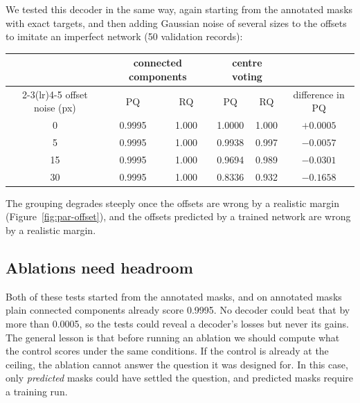 We tested this decoder in the same way, again starting from the annotated masks with exact targets,
and then adding Gaussian noise of several sizes to the offsets to imitate an imperfect
network (50 validation records):
\begin{center}\small
\begin{tabular}{@{}cccccc@{}}
\toprule
 & \multicolumn{2}{c}{connected components} & \multicolumn{2}{c}{centre voting} & \\
\cmidrule(lr){2-3}\cmidrule(lr){4-5}
offset noise (px) & PQ & RQ & PQ & RQ & difference in PQ \\
\midrule
0 & 0.9995 & 1.000 & 1.0000 & 1.000 & $+0.0005$ \\
5 & 0.9995 & 1.000 & 0.9938 & 0.997 & $-0.0057$ \\
15 & 0.9995 & 1.000 & 0.9694 & 0.989 & $-0.0301$ \\
30 & 0.9995 & 1.000 & 0.8336 & 0.932 & $-0.1658$ \\
\bottomrule
\end{tabular}
\end{center}
The grouping degrades steeply once the offsets are wrong by a realistic margin
(Figure~\ref{fig:par-offset}), and the offsets predicted by a trained network are wrong by a
realistic margin.

\subsection{Ablations need headroom}\label{sec:par-headroom}
Both of these tests started from the annotated masks, and on annotated masks plain connected
components already score 0.9995. No decoder could beat that by more than 0.0005, so the tests
could reveal a decoder's losses but never its gains. The general lesson is that before running an
ablation we should compute what the control scores under the same conditions. If the control is
already at the ceiling, the ablation cannot answer the question it was designed for. In this case,
only \emph{predicted} masks could have settled the question, and predicted masks require a training
run.

